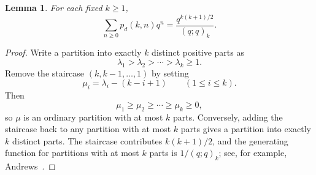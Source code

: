 \documentclass[reqno]{amsart}
\theoremstyle{plain}
\newtheorem{lemma}{Lemma}
\theoremstyle{definition}
\theoremstyle{remark}
\numberwithin{equation}{section}
\newcommand{\qpochn}[3]{(#1;#2)_{#3}}
\begin{document}
\begin{lemma}\label{lem:dk}
For each fixed $k\ge 1$,
\[
\sum_{n\ge 0} p_d(k,n)q^n=\frac{q^{k(k+1)/2}}{\qpochn{q}{q}{k}}.
\]
\end{lemma}

\begin{proof}
Write a partition into exactly $k$ distinct positive parts as
\[
\lambda_1>\lambda_2>\cdots>\lambda_k\ge 1.
\]
Remove the staircase $(k,k-1,\dots,1)$ by setting
\[
\mu_i=\lambda_i-(k-i+1)\qquad(1\le i\le k).
\]
Then
\[
\mu_1\ge \mu_2\ge \cdots\ge \mu_k\ge 0,
\]
so $\mu$ is an ordinary partition with at most $k$ parts. Conversely, adding the staircase back to any partition with at most $k$ parts gives a partition into exactly $k$ distinct parts. The staircase contributes $k(k+1)/2$, and the generating function for partitions with at most $k$ parts is $1/(q;q)_k$; see, for example, Andrews~\cite[Chapter~1]{Andrews}.
\end{proof}
\end{document}
